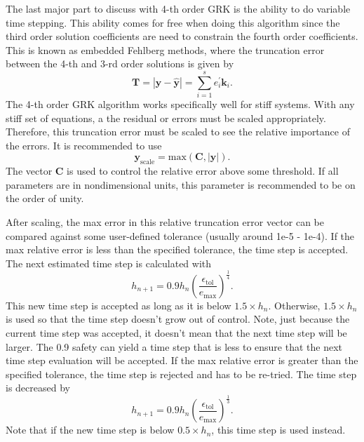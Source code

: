 \documentclass{ansconf}
\numberwithin{equation}{section}
\begin{document}
 \label{sec:var_ts}

The last major part to discuss with 4-th order GRK is the ability to do variable time stepping. This ability comes for free when doing this algorithm since the third order solution coefficients are need to constrain the fourth order coefficients. This is known as embedded Fehlberg methods, where the truncation error between the 4-th and 3-rd order solutions is given by
\begin{equation}
    \mathbf{T} = \left| \mathbf{y} - \hat{\mathbf{y}} \right| = \sum_{i=1}^s e^\prime_i \mathbf{k}_i.
\end{equation}
The 4-th order GRK algorithm works specifically well for stiff systems. With any stiff set of equations, a the residual or errors must be scaled appropriately. Therefore, this truncation error must be scaled to see the relative importance of the errors. It is recommended to use
\begin{equation}
	\mathbf{y}_\mathrm{scale} = \mathrm{max}\left(\mathbf{C},\left|\mathbf{y}\right|\right).
\end{equation}
The vector $\mathbf{C}$ is used to control the relative error above some threshold. If all parameters are in nondimensional units, this parameter is recommended to be on the order of unity.

After scaling, the max error in this relative truncation error vector can be compared against some user-defined tolerance (usually around 1e-5 - 1e-4). If the max relative error is less than the specified tolerance, the time step is accepted. The next estimated time step is calculated with
\begin{equation}
	h_{n+1} = 0.9h_n\left(\frac{\epsilon_\mathrm{tol}}{e_{\mathrm{max}}}\right)^{\frac{1}{4}}.
\end{equation}
This new time step is accepted as long as it is below $1.5\times h_n$. Otherwise, $1.5\times h_n$ is used so that the time step doesn't grow out of control. Note, just because the current time step was accepted, it doesn't mean that the next time step will be larger. The 0.9 safety can yield a time step that is less to ensure that the next time step evaluation will be accepted. If the max relative error is greater than the specified tolerance, the time step is rejected and has to be re-tried. The time step is decreased by
\begin{equation}
	h_{n+1} = 0.9h_n\left(\frac{\epsilon_\mathrm{tol}}{e_{\mathrm{max}}}\right)^{\frac{1}{3}}.
\end{equation}
Note that if the new time step is below $0.5\times h_n$, this time step is used instead.
\end{document}
